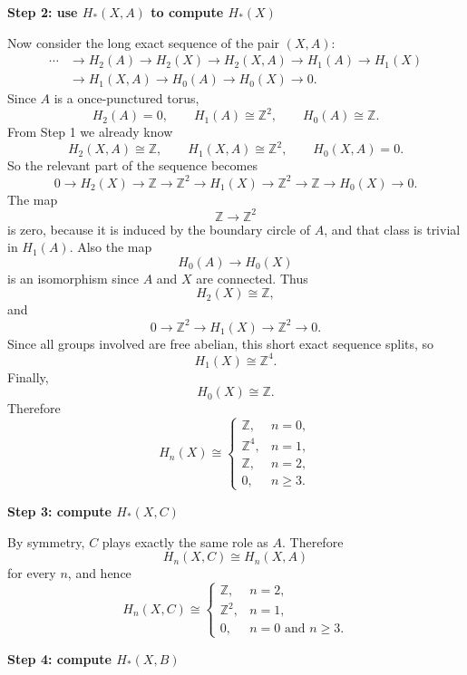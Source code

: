 \begin{solution}
\medskip
\noindent\textbf{Step 2: use \(H_*(X,A)\) to compute \(H_*(X)\)}\par
\smallskip


Now consider the long exact sequence of the pair \((X,A)\):
\[
\begin{aligned}
\cdots&\to H_2(A)\to H_2(X)\to H_2(X,A)
\to H_1(A)\to H_1(X)\\
&\to H_1(X,A)\to H_0(A)\to H_0(X)\to 0.
\end{aligned}
\]
Since \(A\) is a once-punctured torus,
\[
H_2(A)=0,\qquad
H_1(A)\cong \mathbb Z^2,\qquad
H_0(A)\cong \mathbb Z.
\]
From Step 1 we already know
\[
H_2(X,A)\cong \mathbb Z,\qquad
H_1(X,A)\cong \mathbb Z^2,\qquad
H_0(X,A)=0.
\]
So the relevant part of the sequence becomes
\[
0\to H_2(X)\to \mathbb Z\to \mathbb Z^2\to H_1(X)\to \mathbb Z^2\to \mathbb Z\to H_0(X)\to 0.
\]
The map
\[
\mathbb Z\to \mathbb Z^2
\]
is zero, because it is induced by the boundary circle of \(A\), and that class is trivial in \(H_1(A)\). Also the map
\[
H_0(A)\to H_0(X)
\]
is an isomorphism since \(A\) and \(X\) are connected. Thus
\[
H_2(X)\cong \mathbb Z,
\]
and
\[
0\to \mathbb Z^2\to H_1(X)\to \mathbb Z^2\to 0.
\]
Since all groups involved are free abelian, this short exact sequence splits, so
\[
H_1(X)\cong \mathbb Z^4.
\]
Finally,
\[
H_0(X)\cong \mathbb Z.
\]
Therefore
\[
\boxed{
	H_n(X)\cong
	\begin{cases}
		\mathbb Z, & n=0,\\[1mm]
		\mathbb Z^4, & n=1,\\[1mm]
		\mathbb Z, & n=2,\\[1mm]
		0, & n\ge 3.
	\end{cases}
}
\]


\medskip
\noindent\textbf{Step 3: compute \(H_*(X,C)\)}\par
\smallskip


By symmetry, \(C\) plays exactly the same role as \(A\). Therefore
\[
H_n(X,C)\cong H_n(X,A)
\]
for every \(n\), and hence
\[
\boxed{
	H_n(X,C)\cong
	\begin{cases}
		\mathbb Z, & n=2,\\[1mm]
		\mathbb Z^2, & n=1,\\[1mm]
		0, & n=0\text{ and }n\ge 3.
	\end{cases}
}
\]


\medskip
\noindent\textbf{Step 4: compute \(H_*(X,B)\)}\par
\smallskip



\end{solution}
